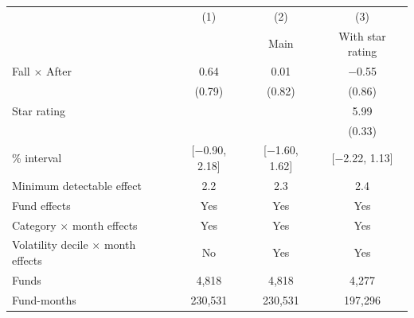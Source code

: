 \begin{tabular}{lccc}
\toprule
 & (1) & (2) & (3) \\
 & & Main & With star rating \\
\midrule
Fall $\times$ After & 0.64 & 0.01 & $-$0.55 \\
 & (0.79) & (0.82) & (0.86) \\
Star rating & & & 5.99 \\
 & & & (0.33) \\
\addlinespace
95\% interval & [$-$0.90, 2.18] & [$-$1.60, 1.62] & [$-$2.22, 1.13] \\
Minimum detectable effect & 2.2 & 2.3 & 2.4 \\
\addlinespace
Fund effects & Yes & Yes & Yes \\
Category $\times$ month effects & Yes & Yes & Yes \\
Volatility decile $\times$ month effects & No & Yes & Yes \\
Funds & 4,818 & 4,818 & 4,277 \\
Fund-months & 230,531 & 230,531 & 197,296 \\
\bottomrule
\end{tabular}
